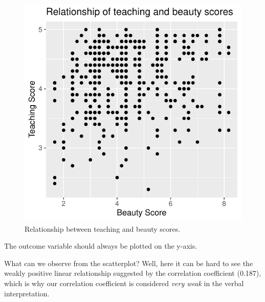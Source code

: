 \documentclass[
  letterpaper,
  DIV=11,
  numbers=noendperiod]{scrartcl}
\begin{document}
\begin{figure}[H]

{\centering \includegraphics{index_files/figure-pdf/unnamed-chunk-4-1.pdf}

}

\caption{Relationship between teaching and beauty scores.}

\end{figure}%

\begin{tcolorbox}[enhanced jigsaw, leftrule=.75mm, opacityback=0, colbacktitle=quarto-callout-note-color!10!white, left=2mm, rightrule=.15mm, colframe=quarto-callout-note-color-frame, colback=white, coltitle=black, breakable, bottomtitle=1mm, title=\textcolor{quarto-callout-note-color}{\faInfo}\hspace{0.5em}{Note}, toprule=.15mm, titlerule=0mm, toptitle=1mm, bottomrule=.15mm, opacitybacktitle=0.6, arc=.35mm]

The outcome variable should always be plotted on the y-axis.

\end{tcolorbox}

What can we observe from the scatterplot? Well, here it can be hard to
see the weakly positive linear relationship suggested by the correlation
coefficient (0.187), which is why our correlation coefficient is
considered \emph{very weak} in the verbal interpretation.
\end{document}
